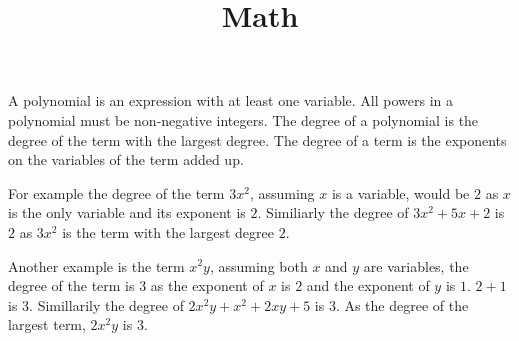 \documentclass[12pt, letterpaper, twoside]{article}
\title{Math}
\begin{document}
	
	\maketitle

A polynomial is an expression with at least one variable. All powers in a polynomial must be non-negative integers. The degree of a polynomial is the degree of the term with the largest degree. The degree of a term is the exponents on the variables of the term added up.\par
For example the degree of the term $3x^2$, assuming $x$ is a variable, would be $2$ as $x$ is the only variable and its exponent is $2$. Similiarly the degree of $3x^2 + 5x +2$ is $2$ as $3x^2$ is the term with the largest degree $2$. \par
Another example is the term $x^2y$, assuming both $x$ and $y$ are variables, the degree of the term is $3$ as the exponent of $x$ is $2$ and the exponent of $y$ is $1$. $2 + 1$ is $3$. Simillarily the degree of $2x^2y + x^2 + 2xy + 5$ is $3$. As the degree of the largest term, $2x^2y$ is $3$. 

	
\end{document}
